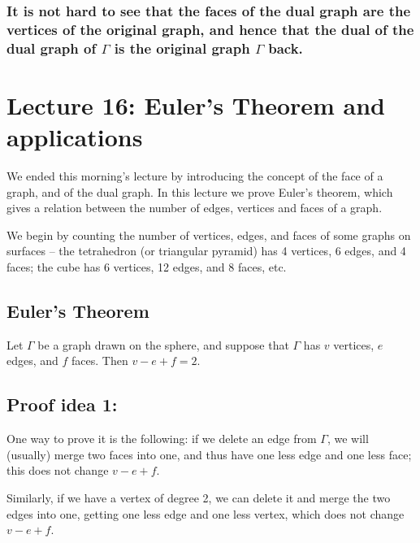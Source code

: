 \documentclass[]{article}
\begin{document}
\subsubsection{\texorpdfstring{It is not hard to see that the faces of the
dual graph are the vertices of the original graph, and hence that the
dual of the dual graph of \(\Gamma\) is the original graph \(\Gamma\)
back.}{It is not hard to see that the faces of the dual graph are the vertices of the original graph, and hence that the dual of the dual graph of \textbackslash{}Gamma is the original graph \textbackslash{}Gamma back.}}\label{it-is-not-hard-to-see-that-the-faces-of-the-dual-graph-are-the-vertices-of-the-original-graph-and-hence-that-the-dual-of-the-dual-graph-of-gamma-is-the-original-graph-gamma-back.}

\section{Lecture 16: Euler's Theorem and applications}

We ended this morning's lecture by introducing the concept of the face
of a graph, and of the dual graph. In this lecture we prove Euler's
theorem, which gives a relation between the number of edges, vertices
and faces of a graph.

We begin by counting the number of vertices, edges, and faces of some
graphs on surfaces -- the tetrahedron (or triangular pyramid) has 4
vertices, 6 edges, and 4 faces; the cube has 6 vertices, 12 edges, and 8
faces, etc.

\subsection{Euler's Theorem}\label{eulers-theorem}

Let \(\Gamma\) be a graph drawn on the sphere, and suppose that
\(\Gamma\) has \(v\) vertices, \(e\) edges, and \(f\) faces. Then
\(v-e+f=2\).

\subsection{Proof idea 1:}\label{proof-idea-1}

One way to prove it is the following: if we delete an edge from
\(\Gamma\), we will (usually) merge two faces into one, and thus have
one less edge and one less face; this does not change \(v-e+f\).

Similarly, if we have a vertex of degree 2, we can delete it and merge
the two edges into one, getting one less edge and one less vertex, which
does not change \(v-e+f\).
\end{document}
